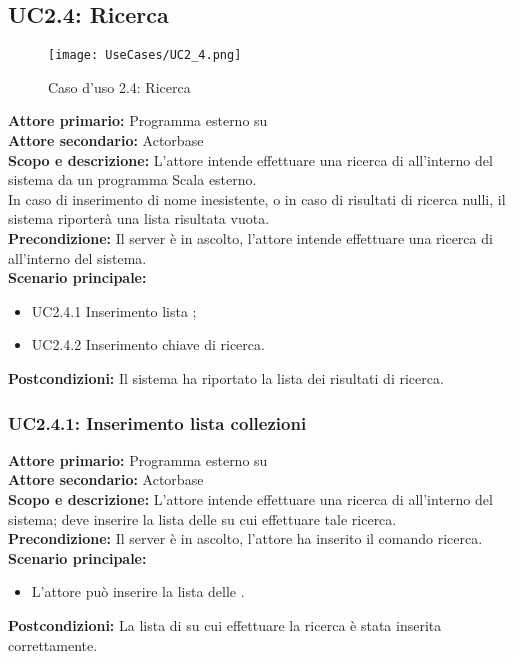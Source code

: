 \documentclass{scalatekids-article}
\begin{document}
\subsection{UC2.4: Ricerca}

\begin{figure}[H]
  \begin{center}
    \texttt{[image: UseCases/UC2\_4.png]}
    \caption{Caso d'uso 2.4: Ricerca }
  \end{center}
\end{figure}
\textbf{Attore primario:} Programma esterno su \\
\textbf{Attore secondario:} Actorbase\\
\textbf{Scopo e descrizione:} L'attore intende effettuare una ricerca di  all'interno del sistema da un programma Scala esterno.\\
In caso di inserimento di nome  inesistente, o in caso di risultati di ricerca nulli, il sistema riporterà una lista risultata vuota.\\ %
\textbf{Precondizione:} Il server è in ascolto, l'attore intende effettuare una ricerca di  all'interno del sistema.\\
\textbf{Scenario principale:}
\begin{itemize}
\item UC2.4.1 Inserimento lista ;
\item UC2.4.2 Inserimento chiave di ricerca.
\end{itemize}
\textbf{Postcondizioni:} Il sistema ha riportato la lista dei risultati di ricerca.

\subsubsection{UC2.4.1: Inserimento lista collezioni}

\textbf{Attore primario:} Programma esterno su \\
\textbf{Attore secondario:} Actorbase\\
\textbf{Scopo e descrizione:} L'attore intende effettuare una ricerca di  all'interno del sistema; deve inserire la lista delle  su cui effettuare tale ricerca.\\
\textbf{Precondizione:} Il server è in ascolto, l'attore ha inserito il comando ricerca.\\
\textbf{Scenario principale:}
\begin{itemize}
\item L'attore può inserire la lista delle .
\end{itemize}
\textbf{Postcondizioni:} La lista di  su cui effettuare la ricerca è stata inserita correttamente.
\end{document}
